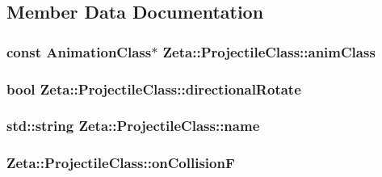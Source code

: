 \subsection{Member Data Documentation}
\hypertarget{classZeta_1_1ProjectileClass_a0c1826e924c0be03a17b8aeaf0f920e1}{
\subsubsection[{anim\+Class}]{\setlength{\rightskip}{0pt plus 5cm}const {\bf Animation\+Class}$\ast$ Zeta\+::\+Projectile\+Class\+::anim\+Class\hspace{0.3cm}{\ttfamily [private]}}}\label{classZeta_1_1ProjectileClass_a0c1826e924c0be03a17b8aeaf0f920e1}
\hypertarget{classZeta_1_1ProjectileClass_ac6336e57e6469d2fdf62960b00ac4ce7}{
\subsubsection[{directional\+Rotate}]{\setlength{\rightskip}{0pt plus 5cm}bool Zeta\+::\+Projectile\+Class\+::directional\+Rotate\hspace{0.3cm}{\ttfamily [private]}}}\label{classZeta_1_1ProjectileClass_ac6336e57e6469d2fdf62960b00ac4ce7}
\hypertarget{classZeta_1_1ProjectileClass_a6eff7fe4769fa6286c2c763a97bd2da6}{
\subsubsection[{name}]{\setlength{\rightskip}{0pt plus 5cm}std\+::string Zeta\+::\+Projectile\+Class\+::name\hspace{0.3cm}{\ttfamily [private]}}}\label{classZeta_1_1ProjectileClass_a6eff7fe4769fa6286c2c763a97bd2da6}
\hypertarget{classZeta_1_1ProjectileClass_a08f1625c591d5cb199dd7cfd110bfe6c}{
\subsubsection[{on\+Collision\+F}]{ Zeta\+::\+Projectile\+Class\+::on\+Collision\+F\hspace{0.3cm}{\ttfamily [private]}}}\label{classZeta_1_1ProjectileClass_a08f1625c591d5cb199dd7cfd110bfe6c}
